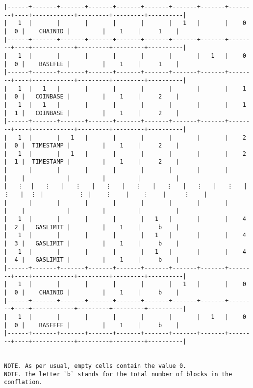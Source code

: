 \documentclass[varwidth=\maxdimen,margin=0.5cm,multi={verbatim}]{standalone}
\begin{document}
\begin{verbatim}
|------+-------+-------+-------+-------+-------+-------+-------+--------+----+------------+---------+---------+----------|
|   1  |       |       |       |       |       |   1   |       |    0   |  0 |    CHAINID |         |    1    |     1    |
|------+-------+-------+-------+-------+-------+-------+-------+--------+----+------------+---------+---------+----------|
|   1  |       |       |       |       |       |       |   1   |    0   |  0 |    BASEFEE |         |    1    |     1    |
|------+-------+-------+-------+-------+-------+-------+-------+--------+----+------------+---------+---------+----------|
|   1  |   1   |       |       |       |       |       |       |    1   |  0 |   COINBASE |         |    1    |     2    |
|   1  |   1   |       |       |       |       |       |       |    1   |  1 |   COINBASE |         |    1    |     2    |
|------+-------+-------+-------+-------+-------+-------+-------+--------+----+------------+---------+---------+----------|
|   1  |       |   1   |       |       |       |       |       |    2   |  0 |  TIMESTAMP |         |    1    |     2    |
|   1  |       |   1   |       |       |       |       |       |    2   |  1 |  TIMESTAMP |         |    1    |     2    |
|      |       |       |       |       |       |       |       |        |    |            |         |         |          |
|   ⋮  |   ⋮   |   ⋮   |   ⋮   |   ⋮   |   ⋮   |   ⋮   |   ⋮   |    ⋮   |  ⋮ |          ⋮ |    ⋮    |    ⋮    |     ⋮    |
|      |       |       |       |       |       |       |       |        |    |            |         |         |          |
|   1  |       |       |       |       |   1   |       |       |    4   |  2 |   GASLIMIT |         |    1    |     b    |
|   1  |       |       |       |       |   1   |       |       |    4   |  3 |   GASLIMIT |         |    1    |     b    |
|   1  |       |       |       |       |   1   |       |       |    4   |  4 |   GASLIMIT |         |    1    |     b    |
|------+-------+-------+-------+-------+-------+-------+-------+--------+----+------------+---------+---------+----------|
|   1  |       |       |       |       |       |   1   |       |    0   |  0 |    CHAINID |         |    1    |     b    |
|------+-------+-------+-------+-------+-------+-------+-------+--------+----+------------+---------+---------+----------|
|   1  |       |       |       |       |       |       |   1   |    0   |  0 |    BASEFEE |         |    1    |     b    |
|------+-------+-------+-------+-------+-------+-------+-------+--------+----+------------+---------+---------+----------|


NOTE. As per usual, empty cells contain the value 0.
NOTE. The letter `b` stands for the total number of blocks in the conflation.

\end{verbatim}
\end{document}

